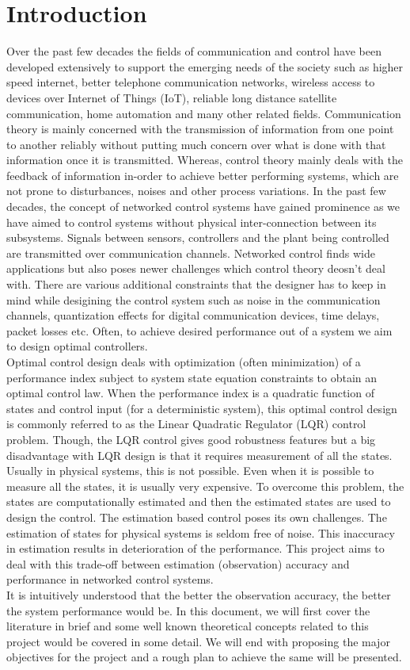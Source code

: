 \documentclass[a4paper,12pt]{article}
\begin{document}
\section{Introduction}
\label{intro}
	Over the past few decades the fields of communication and control have been developed extensively to support the emerging needs of the society such as higher speed internet, better telephone communication networks, wireless access to devices over Internet of Things (IoT), reliable long distance satellite communication, home automation and many other related fields. Communication theory is mainly concerned with the transmission of information from one point to another reliably without putting much concern over what is done with that information once it is transmitted. Whereas, control theory mainly deals with the feedback of information in-order to achieve better performing systems, which are not prone to disturbances, noises and other process variations. In the past few decades, the concept of networked control systems have gained prominence as we have aimed to control systems without physical inter-connection between its subsystems. Signals between sensors, controllers and the plant being controlled are transmitted over communication channels. Networked control finds wide applications but also poses newer challenges which control theory deosn't deal with. There are various additional constraints that the designer has to keep in mind while desigining the control system such as noise in the communication channels, quantization effects for digital communication devices, time delays, packet losses etc. Often, to achieve desired performance out of a system we aim to design optimal controllers. \\
    Optimal control design deals with optimization (often minimization) of a performance index subject to system state equation constraints to obtain an optimal control law. When the performance index is a quadratic function of states and control input (for a deterministic system), this optimal control design is commonly referred to as the Linear Quadratic Regulator (LQR) control problem. Though, the LQR control gives good robustness features but a big disadvantage with LQR design is that it requires measurement of all the states. Usually in physical systems, this is not possible. Even when it is possible to measure all the states, it is usually very expensive. To overcome this problem, the states are computationally estimated and then the estimated states are used to design the control. The estimation based control poses its own challenges. The estimation of states for physical systems is seldom free of noise. This inaccuracy in estimation results in deterioration of the performance. This project aims to deal with this trade-off between estimation (observation) accuracy and performance in networked control systems. \\
    It is intuitively understood that the better the observation accuracy, the better the system performance would be. In this document, we will first cover the literature in brief and some well known theoretical concepts related to this project would be covered in some detail. We will end with proposing the major objectives for the project and a rough plan to achieve the same will be presented.
\end{document}
